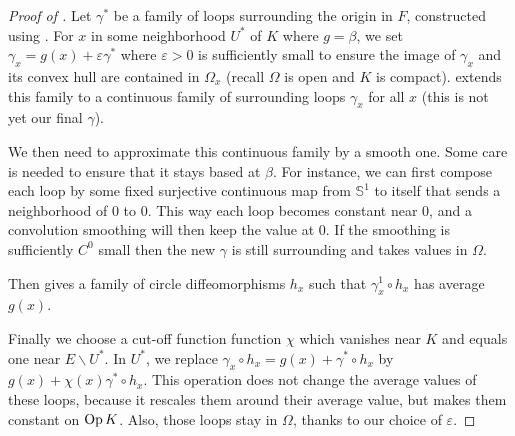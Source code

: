 \begin{proof}[Proof of ]
  \leanok
  Let $γ^*$ be a family of loops surrounding the origin in $F$,
  constructed using .
  For $x$ in some neighborhood $U^*$ of $K$ where $g = β$, we set
  $γ_x = g(x) + εγ^*$ where $ε > 0$ is sufficiently small to ensure
  the image of $γ_x$ and its convex hull are contained in $Ω_x$ (recall $Ω$ is
  open and $K$ is compact).
   extends this family to a continuous
  family of surrounding loops $γ_x$ for all $x$ (this is not yet our
  final $γ$).

  We then need to approximate this continuous family by a smooth one.
  Some care is needed to ensure that it stays based at $β$.
  For instance, we can first compose each loop by some fixed surjective
  continuous map from $𝕊^1$ to itself that sends a neighborhood of $0$
  to $0$.
  This way each loop becomes constant near $0$, and a convolution
  smoothing will then keep the value at $0$.
  If the smoothing is sufficiently $C^0$ small then the new $γ$ is
  still surrounding and takes values in $Ω$.

  Then  gives a family of circle
  diffeomorphisms $h_x$ such that $γ^1_x ∘ h_x$ has average $g(x)$.

  Finally we choose a cut-off function function $χ$ which vanishes near
  $K$ and equals one near $E ∖ U^*$.  In $U^*$, we replace
  $γ_x ∘ h_x = g(x) + γ^* ∘ h_x$ by $g(x) + χ(x)γ^* ∘ h_x$. This
  operation does not change the average values of these loops, because
  it rescales them around their average value, but makes them constant
  on $\operatorname{Op}{K}$. Also, those loops stay in $Ω$, thanks to our choice of $ε$.
\end{proof}

